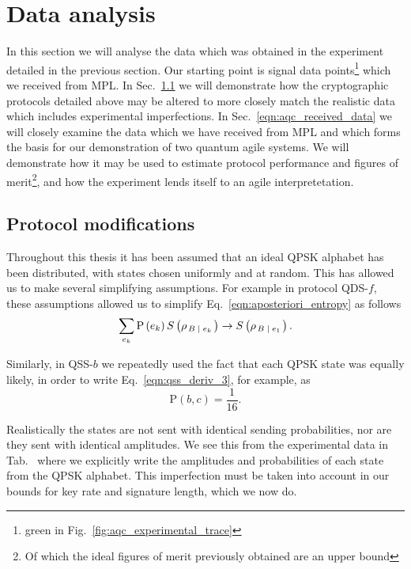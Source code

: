 \section{Data analysis}
In this section we will analyse the data which was obtained in the experiment detailed in the previous section. Our starting point is signal data points\footnote{green in Fig.~\ref{fig:aqc_experimental_trace}} which we received from MPL. In Sec.~\ref{sec:aqc_protocol_modifications} we will demonstrate how the cryptographic protocols detailed above may be altered to more closely match the realistic data which includes experimental imperfections. %
In Sec.~\ref{eqn:aqc_received_data} we will closely examine the data which we have received from MPL and which forms the basis for our demonstration of two quantum agile systems. We will demonstrate how it may be used to estimate protocol performance and figures of merit\footnote{Of which the ideal figures of merit previously obtained are an upper bound}, and how the experiment lends itself to an agile interpretetation.


\subsection{Protocol modifications}\label{sec:aqc_protocol_modifications}
Throughout this thesis it has been assumed that an ideal QPSK alphabet has been distributed, with states chosen uniformly and at random. This has allowed us to make several simplifying assumptions. For example in protocol QDS-$f$, these assumptions allowed us to simplify Eq.~\ref{eqn:aposteriori_entropy} as follows
\begin{equation}
\sum_{e_k} \text{P}\left(e_k\right) S\left(\rho_{\left. B \; \middle| \; e_k\right.}\right) \rightarrow S\left(\rho_{\left. B \; \middle| \; e_1\right.}\right).
\end{equation}

\noindent Similarly, in QSS-$b$ we repeatedly used the fact that each QPSK state was equally likely, in order to write Eq.~\ref{eqn:qss_deriv_3}, for example, as
\begin{equation}
\text{P}\left(b, c\right) = \frac{1}{16}.
\end{equation}

\noindent Realistically the states are not sent with identical sending probabilities, nor are they sent with identical amplitudes. We see this from the experimental data in Tab.~ where we explicitly write the amplitudes and probabilities of each state from the QPSK alphabet. This imperfection must be taken into account in our bounds for key rate and signature length, which we now do.

